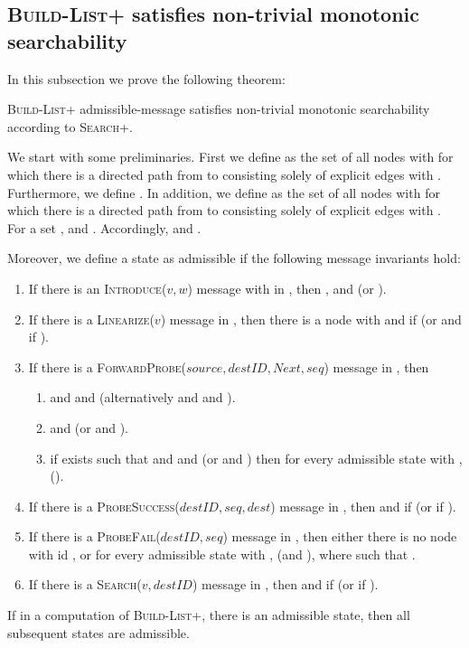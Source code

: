 \documentclass[a4paper,USenglish]{lipics}
\newcommand{\blp}{\textsc{Build-List+}\xspace}
\newcommand{\srp}{\textsc{Search+}\xspace}
\newcommand{\linearize}[1]{\textsc{Linearize(\ensuremath{#1})}\xspace}
\newcommand{\introduce}[1]{\textsc{Introduce(\ensuremath{#1})}\xspace}
\newcommand{\search}[1]{\textsc{Search(\ensuremath{#1})}\xspace}
\newcommand{\forwardprobe}[1]{\textsc{ForwardProbe(\ensuremath{#1})}\xspace}
\newcommand{\psuccess}[1]{\textsc{ProbeSuccess(\ensuremath{#1})}\xspace}
\newcommand{\pfail}[1]{\textsc{ProbeFail(\ensuremath{#1})}\xspace}
\begin{document}
\subsection{\blp satisfies non-trivial monotonic searchability}\label{sec:monotonic_searchability_proof}
In this subsection we prove the following theorem:
\begin{theorem}\label{thm:blp_guarantees_monotonic_searchability}
 \blp admissible-message satisfies non-trivial monotonic searchability according to \srp.
\end{theorem}


We start with some preliminaries.
First we define  as the set of all nodes  with  for which there is a directed path from  to  consisting solely of explicit edges  with .
Furthermore, we define .
In addition, we define  as the set of all nodes  with  for which there is a directed path from  to  consisting solely of explicit edges  with .
For a set ,  and .
Accordingly,  and .

Moreover, we define a state as admissible if the following message invariants hold:
\begin{enumerate}
 \item If there is an \introduce{v,w} message with  in , then , and  (or ).
 \item If there is a \linearize{v} message in , then there is a node  with  and  if  (or  and  if ).
 \item If there is a \forwardprobe{source,destID,Next,seq} message in , then
    \begin{enumerate}
      \item  and  and  
      (alternatively  and  and ).
      \item  and  (or  and ).
      \item if  exists such that  and  and  (or  and ) then for every admissible state with ,  ().
    \end{enumerate}
 \item If there is a \psuccess{destID, seq, dest} message in , then  and  if  (or  if ).
 \item If there is a \pfail{destID, seq} message in , then either there is no node with id , or for every admissible state with ,  (and ), where  such that .
 \item If there is a \search{v, destID} message in , then  and  if  (or  if ).
\end{enumerate}



\begin{lemma}\label{lem:once_admissible_always_admissible}
 If in a computation of \blp, there is an admissible state, then all subsequent states are admissible.
\end{lemma}
\end{document}
